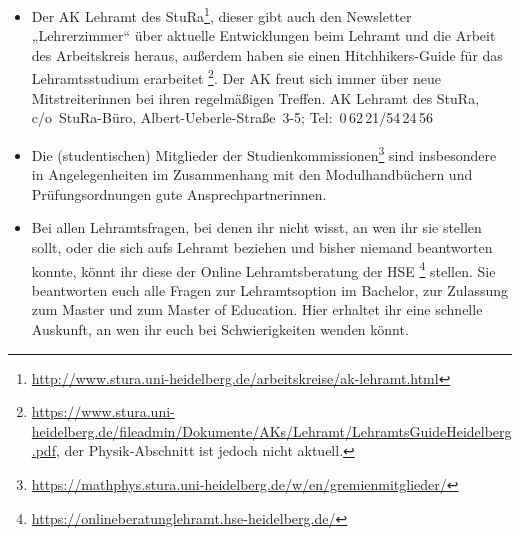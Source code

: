 \begin{itemize}
\item Der AK Lehramt des StuRa\footnote{\url{http://www.stura.uni-heidelberg.de/arbeitskreise/ak-lehramt.html}}, dieser gibt auch den Newsletter „Lehrerzimmer“ über aktuelle Entwicklungen beim Lehramt und die Arbeit des Arbeitskreis heraus, außerdem haben sie einen Hitchhikers-Guide für das Lehramtsstudium erarbeitet \footnote{\url{https://www.stura.uni-heidelberg.de/fileadmin/Dokumente/AKs/Lehramt/LehramtsGuideHeidelberg.pdf}, der Physik-Abschnitt ist jedoch nicht aktuell.}. Der AK freut sich immer über neue Mitstreiterinnen bei ihren regelmäßigen Treffen.  \newline AK Lehramt des StuRa, c/o~StuRa-Büro, Albert-Ueberle-Straße~3-5; Tel:~0\,62\,21/54\,24\,56

\item Die (studentischen) Mitglieder der Studienkommissionen\footnote{\url{https://mathphys.stura.uni-heidelberg.de/w/en/gremienmitglieder/}} sind insbesondere in Angelegenheiten im Zusammenhang mit den Modulhandbüchern und Prüfungsordnungen gute Ansprechpartnerinnen.

\item Bei allen Lehramtsfragen, bei denen ihr nicht wisst, an wen ihr sie stellen sollt, oder die sich aufs Lehramt beziehen und bisher niemand beantworten konnte, könnt ihr diese der Online Lehramtsberatung der HSE \footnote{\url{https://onlineberatunglehramt.hse-heidelberg.de/}} stellen. Sie beantworten euch alle Fragen zur Lehramtsoption im Bachelor, zur Zulassung zum Master und zum Master of Education. Hier erhaltet ihr eine schnelle Auskunft, an wen ihr euch bei Schwierigkeiten wenden könnt.


\end{itemize}


